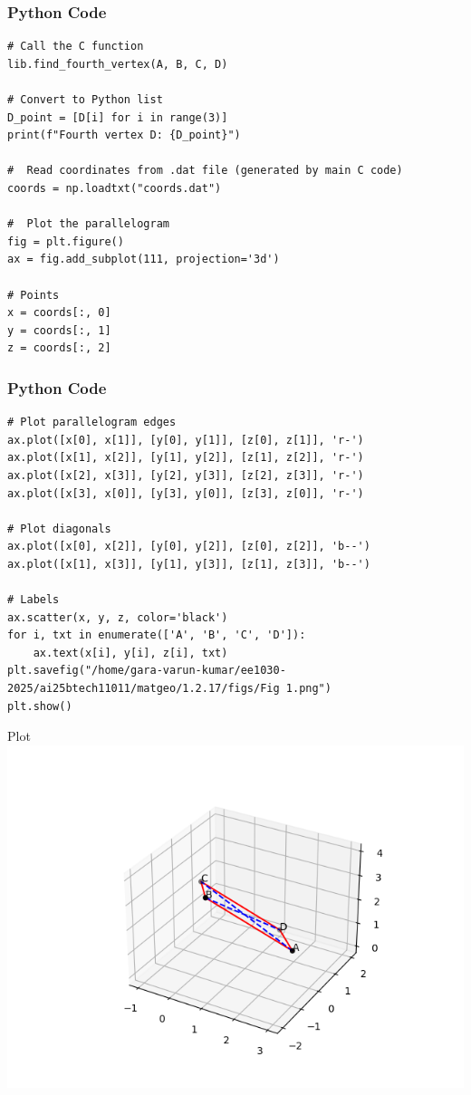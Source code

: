 \documentclass{beamer}
\begin{document}
\begin{frame}[fragile]
    \frametitle{Python Code}
    \begin{lstlisting}
# Call the C function
lib.find_fourth_vertex(A, B, C, D)

# Convert to Python list
D_point = [D[i] for i in range(3)]
print(f"Fourth vertex D: {D_point}")

#  Read coordinates from .dat file (generated by main C code)
coords = np.loadtxt("coords.dat")

#  Plot the parallelogram
fig = plt.figure()
ax = fig.add_subplot(111, projection='3d')

# Points
x = coords[:, 0]
y = coords[:, 1]
z = coords[:, 2]
    \end{lstlisting}
\end{frame}

\begin{frame}[fragile]
    \frametitle{Python Code}
    \begin{lstlisting}
# Plot parallelogram edges
ax.plot([x[0], x[1]], [y[0], y[1]], [z[0], z[1]], 'r-')
ax.plot([x[1], x[2]], [y[1], y[2]], [z[1], z[2]], 'r-')
ax.plot([x[2], x[3]], [y[2], y[3]], [z[2], z[3]], 'r-')
ax.plot([x[3], x[0]], [y[3], y[0]], [z[3], z[0]], 'r-')

# Plot diagonals
ax.plot([x[0], x[2]], [y[0], y[2]], [z[0], z[2]], 'b--')
ax.plot([x[1], x[3]], [y[1], y[3]], [z[1], z[3]], 'b--')

# Labels
ax.scatter(x, y, z, color='black')
for i, txt in enumerate(['A', 'B', 'C', 'D']):
    ax.text(x[i], y[i], z[i], txt)
plt.savefig("/home/gara-varun-kumar/ee1030-2025/ai25btech11011/matgeo/1.2.17/figs/Fig 1.png")
plt.show()
    \end{lstlisting}
\end{frame}

\begin{frame}{Plot}
    \centering
    \includegraphics[width=\columnwidth, height=0.8\textheight, keepaspectratio]{figs/Fig 1.png}     
\end{frame}
\end{document}
